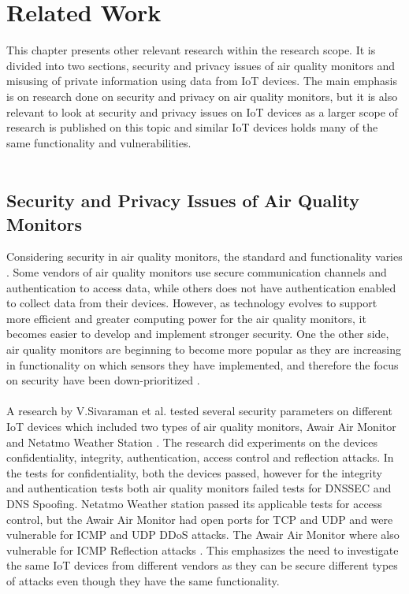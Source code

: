 \chapter{Related Work}
This chapter presents other relevant research within the research scope. It is divided into two sections, security and privacy issues of air quality monitors and misusing of private information using data from IoT devices. The main emphasis is on research done on security and privacy on air quality monitors, but it is also relevant to look at security and privacy issues on IoT devices as a larger scope of research is published on this topic and similar IoT devices holds many of the same functionality and vulnerabilities.\\\\
\section{Security and Privacy Issues of Air Quality Monitors}
Considering security in air quality monitors, the standard and functionality varies \cite{AQMHowFarFunctionality}. Some vendors of air quality monitors use secure communication channels and authentication to access data, while others does not have authentication enabled to collect data from their devices. However, as technology evolves to support more efficient and greater computing power for the air quality monitors, it becomes easier to develop and implement stronger security. One the other side, air quality monitors are beginning to become more popular as they are increasing in functionality on which sensors they have implemented, and therefore the focus on security have been down-prioritized \cite{SecurityAndDataIntInAQM}.
\\\\ 
A research by V.Sivaraman et al. tested several security parameters on different IoT devices which included two types of air quality monitors, Awair Air Monitor and Netatmo Weather Station \cite{IoTSecurityandPrivacyImpl}. The research did experiments on the devices confidentiality, integrity, authentication, access control and reflection attacks. In the tests for confidentiality, both the devices passed, however for the integrity and authentication tests both air quality monitors failed tests for DNSSEC and DNS Spoofing. Netatmo Weather station passed its applicable tests for access control, but the Awair Air Monitor had open ports for TCP and UDP and were vulnerable for ICMP and UDP DDoS attacks. The Awair Air Monitor where also vulnerable for ICMP Reflection attacks \cite{IoTSecurityandPrivacyImpl}. This emphasizes the need to investigate the same IoT devices from different vendors as they can be secure different types of attacks even though they have the same functionality. 
